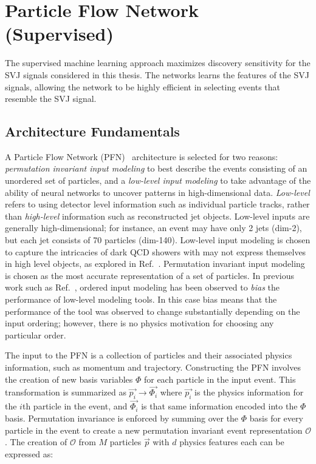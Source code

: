 \section{Particle Flow Network (Supervised)}
\label{subsec:supervised}
The supervised machine learning approach maximizes discovery sensitivity for the SVJ signals considered in this thesis.
The networks learns the features of the SVJ signals, allowing the network to be highly efficient in selecting events that resemble the SVJ signal.

\subsection{Architecture Fundamentals}

A Particle Flow Network (PFN)~\cite{pfn} architecture is selected for two reasons: \textit{permutation invariant input modeling} to best describe the events consisting of an unordered set of particles, and a \textit{low-level input modeling} to take advantage of the ability of neural networks to uncover patterns in high-dimensional data. \textit{Low-level} refers to using detector level information such as individual particle tracks, rather than \textit{high-level} information such as reconstructed jet objects. Low-level inputs are generally high-dimensional; for instance, an event may have only 2 jets (dim-2), but each jet consists of 70 particles (dim-140). Low-level input modeling is chosen to capture the intricacies of dark QCD showers with may not express themselves in high level objects, as explored in Ref.~\cite{darkqcd}. Permutation invariant input modeling is chosen as the most accurate representation of a set of particles. In previous work such as Ref.~\cite{vrnn}, ordered input modeling has been observed to \textit{bias} the performance of low-level modeling tools. In this case bias means that the performance of the tool was observed to change substantially depending on the input ordering; however, there is no physics motivation for choosing any particular order. 

The input to the PFN is a collection of particles and their associated physics information, such as momentum and trajectory. Constructing the PFN involves the creation of new basis variables $\Phi$ for each particle in the input event. This transformation is summarized as $\vec{p_i} \rightarrow \vec{\Phi_i}$ where $\vec{p_i}$ is the physics information for the $i$th particle in the event, and $\vec{\Phi_i}$ is that same information encoded into the $\Phi$ basis. Permutation invariance is enforced by summing over the $\Phi$ basis for every particle in the event to create a new permutation invariant event representation $\mathcal{O}$. The creation of $\mathcal{O}$ from $M$ particles $\vec{p}$ with $d$ physics features each can be expressed as:

